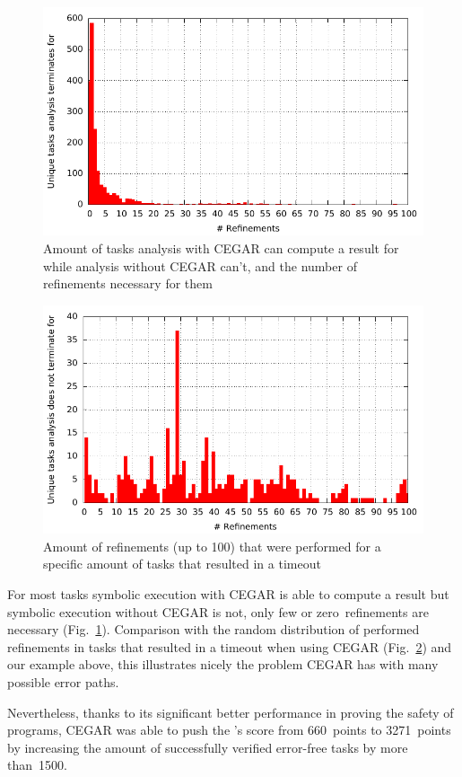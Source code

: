 \begin{figure}[h!]
\includegraphics{evaluation/hg_refinementsForUniqueCorrects}
\caption{Amount of tasks analysis with CEGAR can compute a result for while analysis without CEGAR can't, and the number of refinements necessary for them}
\label{fig:hgRefinementsForUniques}
\end{figure}
\begin{figure}[h!]
\includegraphics{evaluation/hg_refinementsForUniqueTimeouts}
\caption{Amount of refinements (up to 100) that were performed for a specific amount of tasks that resulted in a timeout}
\label{fig:hgRefinementsForTimeouts}
\end{figure}
For most tasks symbolic execution with CEGAR is able to compute a result but symbolic execution without CEGAR is not, only few or zero~refinements are necessary (Fig.~\ref{fig:hgRefinementsForUniques}).
Comparison with the random distribution of performed refinements in tasks that resulted in a timeout when using CEGAR (Fig.~\ref{fig:hgRefinementsForTimeouts}) and our example above,
this illustrates nicely the problem CEGAR has with many possible error paths.

Nevertheless, thanks to its significant better performance in proving the safety of programs, CEGAR was able to push the \symbolicExecutionCPA's score from 660~points to 3271~points by increasing the amount of successfully verified
error-free tasks by more than~1500.

